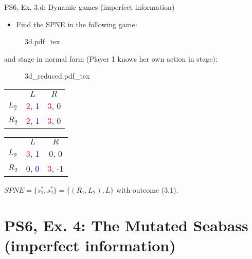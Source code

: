 \begin{frame}{PS6, Ex. 3.d: Dynamic games (imperfect information)}
    \begin{itemize}
      \item[(d)] Find the SPNE in the following game:
    \end{itemize}
    \vspace{-4pt}
    \begin{figure}[!h]
      \center
      \def\svgwidth{.8\columnwidth}
      {3d.pdf_tex}
    \end{figure}
    \vspace{-4pt}
     and  stage in normal form (Player 1 knows her own action in  stage):
    \vspace{-4pt}
    \begin{figure}[!h]
      \center
      \def\svgwidth{.25\columnwidth}
      {3d_reduced.pdf_tex}
    \end{figure}
    \vspace{-9pt}
    \begin{table}
      \begin{tabular}{l|c|c|}
        \multicolumn{1}{c}{} & \multicolumn{1}{c}{\color{blue}$L$} & \multicolumn{1}{c}{$R$} \\\cline{2-3}
        $L_2$ & \textcolor{red}{2}, \textcolor{blue}{1} & \textcolor{red}{3}, 0 \\\cline{2-3}
        $R_2$ & \textcolor{red}{2}, \textcolor{blue}{1} & \textcolor{red}{3}, 0 \\\cline{2-3}
      \end{tabular}
      \enskip
      \begin{tabular}{l|c|c|}
        \multicolumn{1}{c}{} & \multicolumn{1}{c}{\color{blue}$L$} & \multicolumn{1}{c}{$R$} \\\cline{2-3}
        $L_2$ & \textcolor{red}{3}, \textcolor{blue}{1} & 0, 0 \\\cline{2-3}
        $R_2$ & 0, \textcolor{blue}{0} & \textcolor{red}{3}, -1 \\\cline{2-3}
      \end{tabular}
    \end{table}
    \vspace{-4pt}
    $SPNE=\{s_1^{*},s_2^{*}\}=\{(R_1,L_2),L\}$ with outcome (3,1).
    \vfill\null
\end{frame}



\section{PS6, Ex. 4: The Mutated Seabass (imperfect information)}

